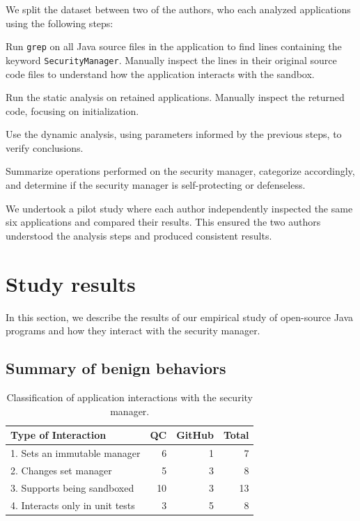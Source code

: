\documentclass{sig-alternate}
\begin{document}
We split the dataset between two of the authors, who each analyzed
applications using the following steps:

\begin{flushenum}\setlength{\parskip}{0pt}
  \setlength{\parsep}{0pt}
  \setlength{\itemsep}{0pt}
\item Run \texttt{grep} on all Java source files in the application to find
lines containing the keyword \texttt{SecurityManager}.
Manually inspect the lines in their original source code files to understand
how the application interacts with the sandbox.
\item Run the static analysis on retained applications. Manually inspect the
  returned code, focusing on initialization. 
\item Use the dynamic analysis, using parameters
  informed by the previous steps, 
to verify conclusions.
\item Summarize operations performed
on the security manager, categorize accordingly, and determine if the 
security manager is self-protecting or defenseless.
\end{flushenum}

We undertook a pilot study where each author
independently inspected the same six applications and compared their
results. This ensured the two authors understood the analysis steps 
and produced consistent results.


\section{Study results}\label{sec:Study-results}

In this section, we describe the results of our empirical study of open-source
Java programs and how they interact with the security manager. 

\subsection{Summary of benign behaviors}\label{sub:Evaluation-of-the-hypotheses}


\begin{table}
\caption{Classification of application
  interactions \label{tab:Classification-of-Application}
with the security manager.}
\begin{tabular}{lrrr}
\toprule 
Type of Interaction & QC & GitHub & Total\tabularnewline
\midrule
1. Sets an immutable manager & 6 & 1 & 7\tabularnewline
2. Changes set manager & 5 & 3 & 8\tabularnewline
3. Supports being sandboxed & 10 & 3 & 13\tabularnewline
4. Interacts only in unit tests & 3 & 5 & 8\tabularnewline
\bottomrule
\end{tabular}
\end{table}
\end{document}

